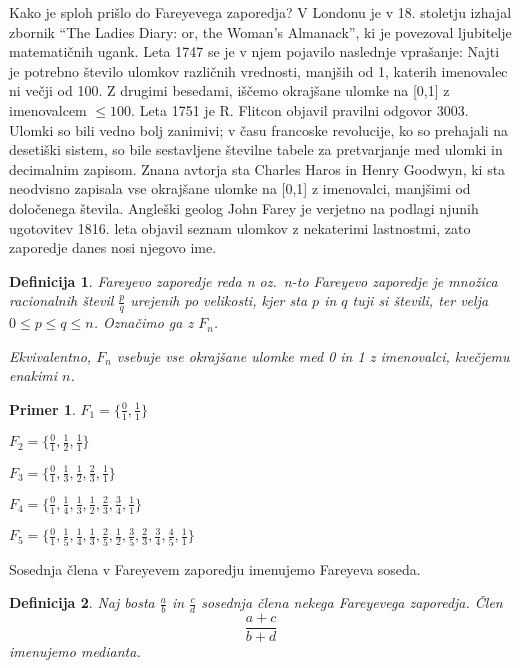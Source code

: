 \documentclass[a4paper,9pt]{article}
\newtheorem{definicija}{Definicija}
\newtheorem{primer}{Primer}
\begin{document}
Kako je sploh prišlo do Fareyevega zaporedja? V Londonu je v 18. stoletju izhajal zbornik ``The Ladies Diary: or, the Woman's Almanack'', ki je povezoval ljubitelje matematičnih ugank. Leta 1747 se je v njem pojavilo naslednje vprašanje: Najti je potrebno število ulomkov različnih vrednosti, manjših od 1, katerih imenovalec ni večji od 100. Z drugimi besedami, iščemo okrajšane ulomke na [0,1] z imenovalcem $\leq100$. Leta 1751 je R. Flitcon objavil pravilni odgovor 3003. Ulomki so bili vedno bolj zanimivi; v času francoske revolucije, ko so prehajali na desetiški sistem, so bile sestavljene številne tabele za pretvarjanje med ulomki in decimalnim zapisom. Znana avtorja sta Charles Haros in Henry Goodwyn, ki sta neodvisno zapisala vse okrajšane ulomke na [0,1] z imenovalci, manjšimi od določenega števila. Angleški geolog John Farey je verjetno na podlagi njunih ugotovitev 1816. leta objavil seznam ulomkov z nekaterimi lastnostmi, zato zaporedje danes nosi njegovo ime.

\begin{definicija}
Fareyevo zaporedje reda n oz.\ n-to Fareyevo zaporedje je množica racionalnih števil $\frac{p}{q}$ urejenih po velikosti, kjer sta $p$ in $q$ tuji si števili, ter velja $0 \leq p \leq q \leq n$. Označimo ga z $F_n$.

Ekvivalentno, $F_n$ vsebuje vse okrajšane ulomke med 0 in 1 z imenovalci, kvečjemu enakimi $n$.
\end{definicija}

\begin{primer}
\(F_1 = \{\frac{0}{1}, \frac{1}{1}\} \)

\(F_2 = \{\frac{0}{1}, \frac{1}{2}, \frac{1}{1}\} \)

\(F_3 = \{\frac{0}{1}, \frac{1}{3}, \frac{1}{2}, \frac{2}{3}, \frac{1}{1}\} \)

\(F_4 = \{\frac{0}{1}, \frac{1}{4}, \frac{1}{3}, \frac{1}{2}, \frac{2}{3}, \frac{3}{4}, \frac{1}{1}\} \)

\(F_5 = \{\frac{0}{1}, \frac{1}{5}, \frac{1}{4}, \frac{1}{3}, \frac{2}{5}, \frac{1}{2}, \frac{3}{5}, \frac{2}{3}, \frac{3}{4}, \frac{4}{5}, \frac{1}{1}\} \)
\end{primer}

Sosednja člena v Fareyevem zaporedju imenujemo Fareyeva soseda.

\begin{definicija}
Naj bosta $\frac{a}{b}$ in $\frac{c}{d}$ sosednja člena nekega Fareyevega zaporedja. Člen \[\frac{a+c}{b+d} \] imenujemo medianta.
\end{definicija}
\end{document}
